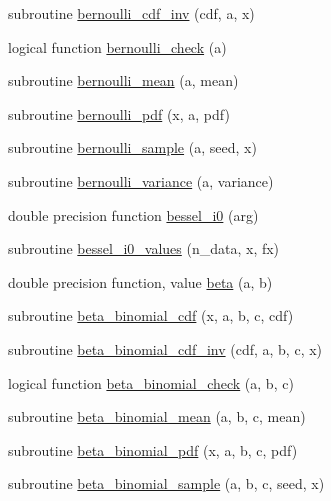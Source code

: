 \begin{DoxyCompactItemize}
\item 
subroutine \hyperlink{_bhabha__fortran__sem__doxy_8f_aba46047e0d6d0160e9e7f72f468fada8}{bernoulli\+\_\+cdf\+\_\+inv} (cdf, a, x)
\item 
logical function \hyperlink{_bhabha__fortran__sem__doxy_8f_ab60b2073960d9ea664fad920aaccfb29}{bernoulli\+\_\+check} (a)
\item 
subroutine \hyperlink{_bhabha__fortran__sem__doxy_8f_a0b4283a0687fb97d4b5e37594d3d960e}{bernoulli\+\_\+mean} (a, mean)
\item 
subroutine \hyperlink{_bhabha__fortran__sem__doxy_8f_a89fa5f5a4cbaa3ec07e13d430cdbb0b8}{bernoulli\+\_\+pdf} (x, a, pdf)
\item 
subroutine \hyperlink{_bhabha__fortran__sem__doxy_8f_ae46a4cd68c1ca43b8cd6149a3af3451c}{bernoulli\+\_\+sample} (a, seed, x)
\item 
subroutine \hyperlink{_bhabha__fortran__sem__doxy_8f_aac79468ade583fbf0b0faf3fab44bc96}{bernoulli\+\_\+variance} (a, variance)
\item 
double precision function \hyperlink{_bhabha__fortran__sem__doxy_8f_a56f2ab001fb7fd87fd8c17369a866f5a}{bessel\+\_\+i0} (arg)
\item 
subroutine \hyperlink{_bhabha__fortran__sem__doxy_8f_a0508ca5dc920b3b002ac4d769e9e7128}{bessel\+\_\+i0\+\_\+values} (n\+\_\+data, x, fx)
\item 
double precision function, value \hyperlink{_bhabha__fortran__sem__doxy_8f_a4545c4482f31f1e6eddae40f6ed6bbfb}{beta} (a, b)
\item 
subroutine \hyperlink{_bhabha__fortran__sem__doxy_8f_ab79beb1b437d17ea84c53e4d40471f80}{beta\+\_\+binomial\+\_\+cdf} (x, a, b, c, cdf)
\item 
subroutine \hyperlink{_bhabha__fortran__sem__doxy_8f_ae6870b2fc15398bbb52dd3b2ed8c92fb}{beta\+\_\+binomial\+\_\+cdf\+\_\+inv} (cdf, a, b, c, x)
\item 
logical function \hyperlink{_bhabha__fortran__sem__doxy_8f_a35d163e54f3880b3b4a4fc1c46ec6690}{beta\+\_\+binomial\+\_\+check} (a, b, c)
\item 
subroutine \hyperlink{_bhabha__fortran__sem__doxy_8f_af4c24e7e5f9bebb7bde58f72d2d0bef1}{beta\+\_\+binomial\+\_\+mean} (a, b, c, mean)
\item 
subroutine \hyperlink{_bhabha__fortran__sem__doxy_8f_a0b1b4e2bbf9c50969318fac23e17215c}{beta\+\_\+binomial\+\_\+pdf} (x, a, b, c, pdf)
\item 
subroutine \hyperlink{_bhabha__fortran__sem__doxy_8f_ad097654db5e79584fe38d2a53c8ffad8}{beta\+\_\+binomial\+\_\+sample} (a, b, c, seed, x)

\end{DoxyCompactItemize}
